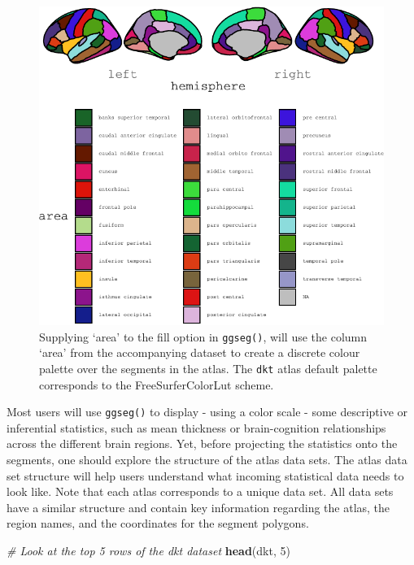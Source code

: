 \documentclass[fleqn,10pt]{wlpeerj} %
\newenvironment{Shaded}{\begin{snugshade}}{\end{snugshade}}
\newcommand{\CommentTok}[1]{\textcolor[rgb]{0.56,0.35,0.01}{\textit{#1}}}
\newcommand{\DecValTok}[1]{\textcolor[rgb]{0.00,0.00,0.81}{#1}}
\newcommand{\KeywordTok}[1]{\textcolor[rgb]{0.13,0.29,0.53}{\textbf{#1}}}
\newcommand{\NormalTok}[1]{#1}
\begin{document}
\begin{figure}
\centering
\includegraphics{msc_ggseg_files/figure-latex/fill-1.pdf}
\caption{\label{fig:fill}Supplying `area' to the fill option in \texttt{ggseg()}, will use the column `area' from the accompanying dataset to create a discrete colour palette over the segments in the atlas. The \texttt{dkt} atlas default palette corresponds to the FreeSurferColorLut scheme.}
\end{figure}

Most users will use \texttt{ggseg()} to display - using a color scale - some descriptive or inferential statistics, such as mean thickness or brain-cognition relationships across the different brain regions.
Yet, before projecting the statistics onto the segments, one should explore the structure of the atlas data sets.
The atlas data set structure will help users understand what incoming statistical data needs to look like.
Note that each atlas corresponds to a unique data set.
All data sets have a similar structure and contain key information regarding the atlas, the region names, and the coordinates for the segment polygons.

\small

\begin{Shaded}
\begin{Highlighting}[]
\CommentTok{\# Look at the top 5 rows of the dkt dataset}
\KeywordTok{head}\NormalTok{(dkt, }\DecValTok{5}\NormalTok{)}
\end{Highlighting}
\end{Shaded}
\end{document}
